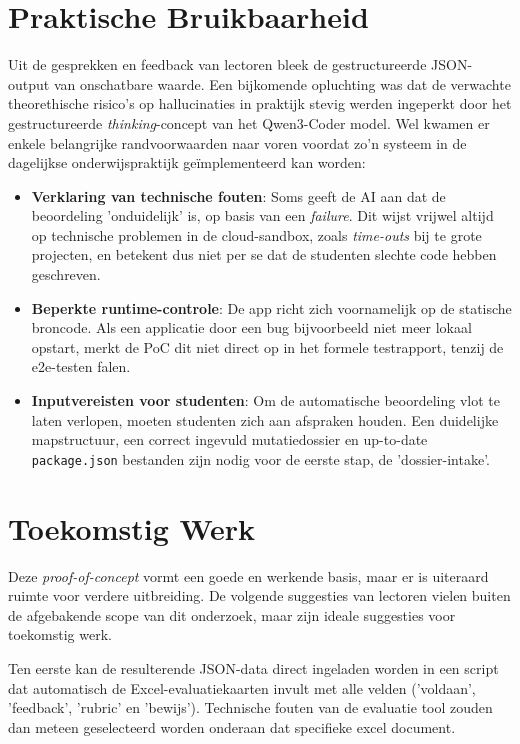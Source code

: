 \section{Praktische Bruikbaarheid}

Uit de gesprekken en feedback van lectoren bleek de gestructureerde JSON-output van onschatbare waarde. Een bijkomende opluchting was dat de verwachte theorethische risico's op hallucinaties in praktijk stevig werden ingeperkt door het gestructureerde \textit{thinking}-concept van het Qwen3-Coder model. Wel kwamen er enkele belangrijke randvoorwaarden naar voren voordat zo'n systeem in de dagelijkse onderwijspraktijk geïmplementeerd kan worden:
\begin{itemize}
    \item \textbf{Verklaring van technische fouten}: Soms geeft de AI aan dat de beoordeling 'onduidelijk' is, op basis van een \textit{failure}. Dit wijst vrijwel altijd op technische problemen in de cloud-sandbox, zoals \textit{time-outs} bij te grote projecten, en betekent dus niet per se dat de studenten slechte code hebben geschreven.
    \item \textbf{Beperkte runtime-controle}: De app richt zich voornamelijk op de statische broncode. Als een applicatie door een bug bijvoorbeeld niet meer lokaal opstart, merkt de PoC dit niet direct op in het formele testrapport, tenzij de e2e-testen falen.
    \item \textbf{Inputvereisten voor studenten}: Om de automatische beoordeling vlot te laten verlopen, moeten studenten zich aan afspraken houden. Een duidelijke mapstructuur, een correct ingevuld mutatiedossier en up-to-date \texttt{package.json} bestanden zijn nodig voor de eerste stap, de 'dossier-intake'. 
\end{itemize}

\section{Toekomstig Werk}

Deze \textit{proof-of-concept} vormt een goede en werkende basis, maar er is uiteraard ruimte voor verdere uitbreiding. De volgende suggesties van lectoren vielen buiten de afgebakende scope van dit onderzoek, maar zijn ideale suggesties voor toekomstig werk. 

\vspace{1em}

Ten eerste kan de resulterende JSON-data direct ingeladen worden in een script dat automatisch de Excel-evaluatiekaarten invult met alle velden ('voldaan', 'feedback', 'rubric' en 'bewijs'). Technische fouten van de evaluatie tool zouden dan meteen geselecteerd  worden onderaan dat specifieke excel document.

